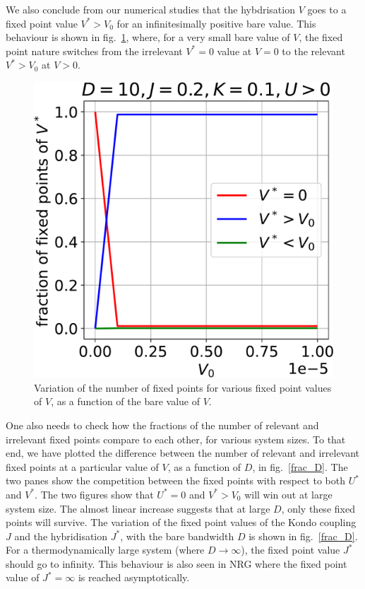 \documentclass[12pt,twoside]{article}
\numberwithin{equation}{section}
\begin{document}
\pb We also conclude from our numerical studies that the hybdrisation \(V\) goes to a fixed point value \(V^* > V_0\) for an infinitesimally positive bare value. This behaviour is shown in fig.~\ref{V_frac}, where, for a very small bare value of \(V\), the fixed point nature switches from the irrelevant \(V^*=0\) value at \(V=0\) to the relevant \(V^* > V_0\) at \(V>0\).
\begin{figure}[htbp!]
	\centering
	\includegraphics[scale=0.39]{../figures/quad1V.pdf}
	\caption{Variation of the number of fixed points for various fixed point values of \(V\), as a function of the bare value of \(V\).}
	\label{V_frac}
\end{figure}
\pb One also needs to check how the fractions of the number of relevant and irrelevant fixed points compare to each other, for various system sizes. To that end, we have plotted the difference between the number of relevant and irrelevant fixed points at a particular value of $V$, as a function of $D$, in fig.~\ref{frac_D}. The two panes show the competition between the fixed points with respect to both \(U^*\) and \(V^*\). The two figures show that \(U^*=0\) and \(V^*>V_0\) will win out at large system size. The almost linear increase suggests that at large $D$, only these fixed points will survive.
\pb The variation of the fixed point values of the Kondo coupling \(J\) and the hybridisation \(J^*\), with the bare bandwidth $D$ is shown in fig.~\ref{frac_D}. For a thermodynamically large system (where $D \to \infty$), the fixed point value \(J^*\) should go to infinity. This behaviour is also seen in NRG where the fixed point value of \(J^* = \infty\) is reached asymptotically.
\end{document}
